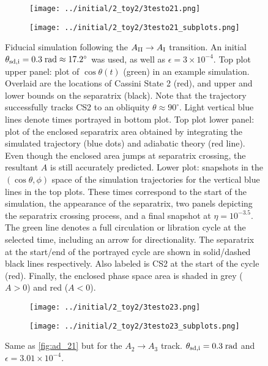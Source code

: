 \documentclass[
        fleqn,
        usenatbib,
        referee,
    ]{mnras}
\newcommand*{\p}[1]{\left(#1\right)}
\begin{document}
\begin{figure}
    \centering
    \begin{subfigure}{\columnwidth}
        \centering
        \texttt{[image: ../initial/2\_toy2/3testo21.png]}
    \end{subfigure}
    \begin{subfigure}{\columnwidth}
        \centering
        \texttt{[image: ../initial/2\_toy2/3testo21\_subplots.png]}
    \end{subfigure}
    \caption{Fiducial simulation following the $A_{\rm II} \to A_{\rm I}$
    transition. An initial $\theta_{\rm sd, i} = 0.3\;\mathrm{rad} \approx
    17.2^\circ$ was used, as well as $\epsilon = 3 \times 10^{-4}$. Top plot
    upper panel: plot of $\cos \theta(t)$ (green) in an example simulation.
    Overlaid are the locations of Cassini State 2 (red), and upper and lower
    bounds on the separatrix (black). Note that the trajectory successfully
    tracks CS2 to an obliquity $\theta \approx 90^\circ$. Light vertical blue
    lines denote times portrayed in bottom plot. Top plot lower panel: plot of
    the enclosed separatrix area obtained by integrating the simulated
    trajectory (blue dots) and adiabatic theory (red line). Even though the
    enclosed area jumps at separatrix crossing, the resultant $A$ is still
    accurately predicted. Lower plot: snapshots in the $\p{\cos \theta, \phi}$
    space of the simulation trajectories for the vertical blue lines in the top
    plots. These times correspond to the start of the simulation, the appearance
    of the separatrix, two panels depicting the separatrix crossing process, and
    a final snapshot at $\eta = 10^{-3.5}$. The green line denotes a full
    circulation or libration cycle at the selected time, including an arrow for
    directionality. The separatrix at the start/end of the portrayed cycle are
    shown in solid/dashed black lines respectively. Also labeled is CS2 at the
    start of the cycle (red). Finally, the enclosed phase space area is shaded
    in grey ($A > 0$) and red ($A < 0$).}\label{fig:ad_21}
\end{figure}
\begin{figure}
    \centering
    \begin{subfigure}{\columnwidth}
        \centering
        \texttt{[image: ../initial/2\_toy2/3testo23.png]}
    \end{subfigure}
    \begin{subfigure}{\columnwidth}
        \centering
        \texttt{[image: ../initial/2\_toy2/3testo23\_subplots.png]}
    \end{subfigure}
    \caption{Same as \autoref{fig:ad_21} but for the $A_2 \to A_3$ track.
    $\theta_{\rm sd, i} = 0.3\;\mathrm{rad}$ and $\epsilon = 3.01 \times
    10^{-4}$.}\label{fig:ad_23}
\end{figure}
\end{document}
